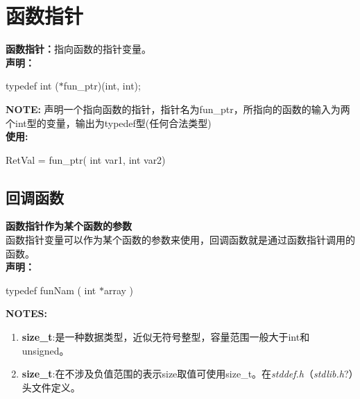 \documentclass[UTF8]{ctexart}
\begin{document}
			\clearpage
			\section{函数指针}
			\textbf{函数指针：}指向函数的指针变量。\\
			\textbf{声明：}\begin{framed}
				typedef int ($*$fun\_ptr)(int, int);
			\end{framed}
			\textbf{NOTE:} 声明一个指向函数的指针，指针名为fun\_ptr，所指向的函数的输入为两个int型的变量，输出为typedef型(任何合法类型)\\
			\textbf{使用:} 
			\begin{framed}
				RetVal = fun\_ptr( int var1, int var2)
			\end{framed}
			\subsection{回调函数}
			\textbf{函数指针作为某个函数的参数}\\
			函数指针变量可以作为某个函数的参数来使用，回调函数就是通过函数指针调用的函数。\\
			\textbf{声明：}\begin{framed}
				typedef funNam ( int $*$array )
			\end{framed}
			\begin{framed}
				\textbf{NOTES:}
				\begin{enumerate}
					\item \textbf{size\_t}:是一种数据类型，近似无符号整型，容量范围一般大于int和unsigned。
					\item \textbf{size\_t}:在不涉及负值范围的表示size取值可使用size\_t。在\emph{stddef.h}（\emph{stdlib.h}?）头文件定义。
				\end{enumerate}
			\end{framed}

			\clearpage
\end{document}
